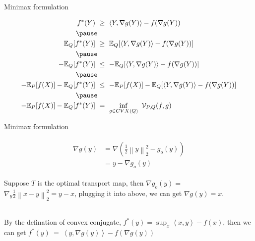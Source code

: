 \documentclass{beamer}		%
\begin{document}
\begin{frame}{Minimax formulation}

\begin{eqnarray*}
\begin{aligned}
f^*(Y) \ &\ge \ \left \langle Y,\nabla g(Y) \right \rangle - f(\nabla g(Y))
\\
\pause
\\
\mathbb{E}_Q[f^*(Y)] \ &\ge \ \mathbb{E}_Q[\left \langle Y,\nabla g(Y) \right \rangle - f(\nabla g(Y))] 
\\
\pause
\\
- \mathbb{E}_Q[f^*(Y)] \ &\leq \ -\mathbb{E}_Q[\left \langle Y,\nabla g(Y) \right \rangle - f(\nabla g(Y))] 
\\
\pause
\\
- \mathbb{E}_P[f(X)] - \mathbb{E}_Q[f^*(Y)] \ &\leq \ -\mathbb{E}_P[f(X)]-\mathbb{E}_Q[\left \langle Y,\nabla g(Y) \right \rangle - f(\nabla g(Y))]
\\
\pause
\\
- \mathbb{E}_P[f(X)] - \mathbb{E}_Q[f^*(Y)] \ &= \  \inf_{g \in CVX(Q)} \  \mathcal{V}_{P,Q} (f,g)
\end{aligned}    
\end{eqnarray*}



\end{frame}




\begin{frame}{Minimax formulation}

\begin{eqnarray*}
\begin{aligned}
\nabla g(y) &= \nabla (\frac{1}{2} \left\|y \right\|_2^2 - g_{o}(y)) \\
&= y - \nabla g_{o}(y)
\end{aligned}    
\end{eqnarray*}

Suppose $T$ is the optimal transport map, then $\nabla g_{o}(y) =$ $ \nabla_y \frac{1}{2}  \left\| x - y \right\|_2^2 = y - x$, plugging it into above, we can get $\nabla g(y) = x$.

~\\
By the defination of convex conjugate, $f^*(y)=\sup_x \left \langle x,y \right \rangle - f(x)$, then we can get $f^*(y) \ = \ \left \langle y,\nabla g(y) \right \rangle - f(\nabla g(y))$

\end{frame}
\end{document}
